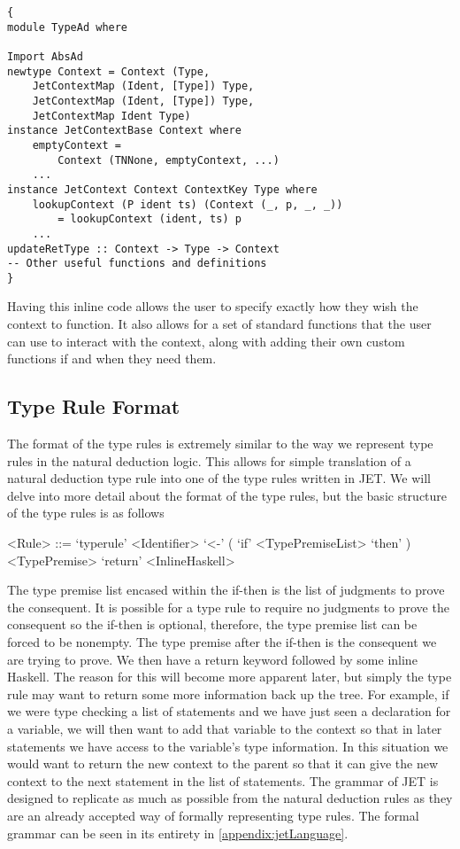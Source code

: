 \begin{lstlisting}[caption = Example of initial inline haskell code, label=lst:inlineHaskellCode]
{
module TypeAd where

Import AbsAd
newtype Context = Context (Type, 
    JetContextMap (Ident, [Type]) Type, 
    JetContextMap (Ident, [Type]) Type, 
    JetContextMap Ident Type)
instance JetContextBase Context where
    emptyContext = 
        Context (TNNone, emptyContext, ...)
    ...
instance JetContext Context ContextKey Type where
    lookupContext (P ident ts) (Context (_, p, _, _)) 
        = lookupContext (ident, ts) p
    ...
updateRetType :: Context -> Type -> Context
-- Other useful functions and definitions
}
\end{lstlisting}

Having this inline code allows the user to specify exactly how they wish the context to function.
It also allows for a set of standard functions that the user can use to interact with the context, along with adding their own custom functions if and when they need them.

\subsection{Type Rule Format}

The format of the type rules is extremely similar to the way we represent type rules in the natural deduction logic.
This allows for simple translation of a natural deduction type rule into one of the type rules written in JET.
We will delve into more detail about the format of the type rules, but the basic structure of the type rules is as follows

\begin{grammar}
    <Rule> ::= `typerule' <Identifier> `<-' ( `if' <TypePremiseList> `then' ) <TypePremise> `return' <InlineHaskell>
\end{grammar}

The type premise list encased within the if-then is the list of judgments to prove the consequent.
It is possible for a type rule to require no judgments to prove the consequent so the if-then is optional, therefore, the type premise list can be forced to be nonempty.
The type premise after the if-then is the consequent we are trying to prove.
We then have a return keyword followed by some inline Haskell.
The reason for this will become more apparent later, but simply the type rule may want to return some more information back up the tree.
For example, if we were type checking a list of statements and we have just seen a declaration for a variable, we will then want to add that variable to the context so that in later statements we have access to the variable's type information.
In this situation we would want to return the new context to the parent so that it can give the new context to the next statement in the list of statements.
The grammar of JET is designed to replicate as much as possible from the natural deduction rules as they are an already accepted way of formally representing type rules.
The formal grammar can be seen in its entirety in \autoref{appendix:jetLanguage}.